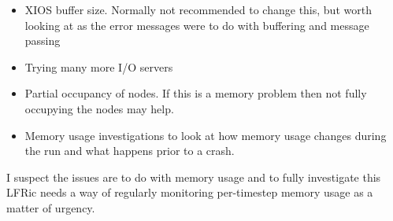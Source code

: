 \begin{itemize}
  \item XIOS buffer size. Normally not recommended to change this, but worth looking at as the error messages were to do with buffering and message passing
  \item Trying many more I/O servers
  \item Partial occupancy of nodes. If this is a memory problem then not fully occupying the nodes may help.
  \item Memory usage investigations to look at how memory usage changes during the run and what happens prior to a crash.
\end{itemize}


I suspect the issues are to do with memory usage and to fully investigate this LFRic needs a way of regularly monitoring per-timestep memory usage as a matter of urgency.
 

